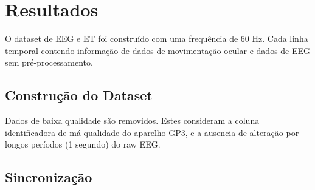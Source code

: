 \chapter{Resultados}
O dataset de EEG e ET foi construído com uma frequência de 60 Hz. Cada linha 
temporal contendo informação de dados de movimentação ocular e dados de EEG sem pré-processamento. 

\section{Construção do Dataset}
Dados de baixa qualidade são removidos. Estes consideram a coluna identificadora de má qualidade 
do aparelho GP3, e a ausencia de alteração por longos períodos (1 segundo) do raw EEG. 

\section{Sincronização}




